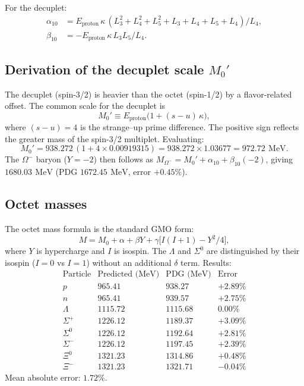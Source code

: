 \documentclass[aps,prd,reprint,twocolumn,showpacs,superscriptaddress]{revtex4-2}
\newcommand{\mev}{\,\text{MeV}}
\begin{document}
For the decuplet:
\begin{align}
\alpha_{10} &= E_{\text{proton}}\,\kappa\,(L_3^2 + L_4^2 + L_5^2 + L_3 + L_4 + L_5 + L_4)/L_4, \label{eq:alpha10} \\
\beta_{10} &= -E_{\text{proton}}\,\kappa\,L_3 L_5 / L_4. \label{eq:beta10}
\end{align}

\subsection{Derivation of the decuplet scale $M_0'$}

The decuplet (spin-3/2) is heavier than the octet (spin-1/2) by a
flavor-related offset.  The common scale for the decuplet is
\begin{equation}
M_0' \equiv E_{\text{proton}}\bigl(1 + (s-u)\,\kappa\bigr),
\label{eq:M0prime}
\end{equation}
where $(s-u) = 4$ is the strange--up prime difference.  The positive
sign reflects the greater mass of the spin-3/2 multiplet.  Evaluating:
\begin{equation}
M_0' = 938.272\,(1 + 4 \times 0.00919315)
     = 938.272 \times 1.03677
     = 972.72\ \mev.
\label{eq:M0prime_value}
\end{equation}
The $\Omega^-$ baryon ($Y=-2$) then follows as
$M_{\Omega^-} = M_0' + \alpha_{10} + \beta_{10}(-2)$, giving
$1680.03\ \mev$ (PDG $1672.45\ \mev$, error $+0.45\%$).

\subsection{Octet masses}

The octet mass formula is the standard GMO form:
\begin{equation}
M = M_0 + \alpha + \beta Y + \gamma\bigl[I(I+1) - Y^2/4\bigr],
\label{eq:gmo_octet}
\end{equation}
where $Y$ is hypercharge and $I$ is isospin.  The $\Lambda$ and
$\Sigma^0$ are distinguished by their isospin ($I=0$ vs $I=1$)
without an additional $\delta$ term.  Results:
\[
\begin{array}{lcccr}
\text{Particle} & \text{Predicted (MeV)} & \text{PDG (MeV)} & \text{Error} \\
p               & 965.41   & 938.27   & +2.89\% \\
n               & 965.41   & 939.57   & +2.75\% \\
\Lambda         & 1115.72  & 1115.68  & 0.00\% \\
\Sigma^+        & 1226.12  & 1189.37  & +3.09\% \\
\Sigma^0        & 1226.12  & 1192.64  & +2.81\% \\
\Sigma^-        & 1226.12  & 1197.45  & +2.39\% \\
\Xi^0           & 1321.23  & 1314.86  & +0.48\% \\
\Xi^-           & 1321.23  & 1321.71  & -0.04\%
\end{array}
\]
Mean absolute error: $1.72\%$.
\end{document}
